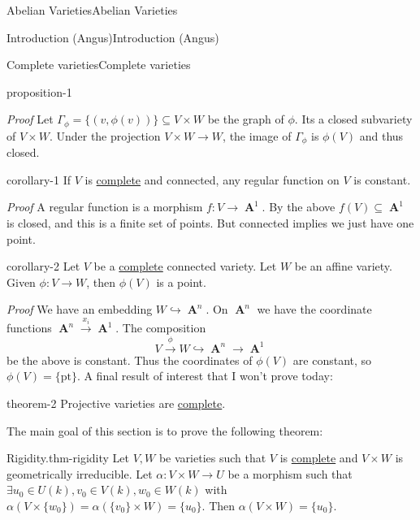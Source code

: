 \documentclass[10pt,]{book}
\makeatletter
\renewcommand*{\proofname}{Proof}
\renewenvironment{proof}[1][\proofname]{\par
  \pushQED{\qed}%
  \normalfont \topsep6\p@\@plus6\p@\relax
  \trivlist
  \item\relax
    {\itshape
    #1\@addpunct{.}}\hspace\labelsep\ignorespaces
}{%
  \popQED\endtrivlist\@endpefalse
}
\numberwithin{equation}{section}
\DeclareMathOperator{\aff}{\mathbf{A}}
\makeatother
\begin{document}
\begin{chapterptx}{Abelian Varieties}{}{Abelian Varieties}{}{}
\begin{sectionptx}{Introduction (Angus)}{}{Introduction (Angus)}{}{}
\begin{subsectionptx}{Complete varieties}{}{Complete varieties}{}{}
\begin{proposition}{}{}{proposition-1}
\end{proposition}
\begin{proof}\hypertarget{proof-2}{}
\hypertarget{p-22}{}%
Let \(\Gamma_\phi = \{(v, \phi(v))\} \subseteq V\times W\) be the graph of \(\phi\). Its a closed subvariety of \(V\times W\). Under the projection \(V\times W \to W\), the image of \(\Gamma_\phi\) is \(\phi(V)\) and thus closed.%
\end{proof}
\begin{corollary}{}{}{corollary-1}%
\hypertarget{p-23}{}%
If \(V\) is \hyperref[def-abelian-complete-var]{complete} and connected, any regular function on \(V\) is constant.%
\end{corollary}
\begin{proof}\hypertarget{proof-3}{}
\hypertarget{p-24}{}%
A regular function is a morphism \(f\colon V \to \aff^1\). By the above \(f(V) \subseteq \aff^1\) is closed, and this is a finite set of points. But connected implies we just have one point.%
\end{proof}
\begin{corollary}{}{}{corollary-2}%
\hypertarget{p-25}{}%
Let \(V \) be a \hyperref[def-abelian-complete-var]{complete} connected variety. Let \(W\) be an affine variety. Given \(\phi\colon V\to W\), then \(\phi (V)\) is a point.%
\end{corollary}
\begin{proof}\hypertarget{proof-4}{}
\hypertarget{p-26}{}%
We have an embedding \(W \hookrightarrow \aff^n\). On \(\aff^n\) we have the coordinate functions \(\aff^n \xrightarrow{x_i} \aff^1\). The composition%
\begin{equation*}
V \xrightarrow\phi W \hookrightarrow\aff^n \to \aff^1
\end{equation*}
be the above is constant. Thus the coordinates of \(\phi(V)\) are constant, so \(\phi(V) = \{\text{pt}\}\).%
\end{proof}
\hypertarget{p-27}{}%
A final result of interest that I won't prove today:%
\begin{theorem}{}{}{theorem-2}%
\hypertarget{p-28}{}%
Projective varieties are \hyperref[def-abelian-complete-var]{complete}.%
\end{theorem}
\hypertarget{p-29}{}%
The main goal of this section is to prove the following theorem:%
\begin{theorem}{Rigidity.}{}{thm-rigidity}%
\hypertarget{p-30}{}%
Let \(V,W\) be varieties such that \(V\) is \hyperref[def-abelian-complete-var]{complete} and  \(V\times W\) is geometrically irreducible. Let \(\alpha\colon V\times W \to U\) be a morphism such that \(\exists u_0\in U(k), v_0\in V(k), w_0\in W(k)\) with \(\alpha(V\times\{w_0\}) = \alpha (\{v_0\}\times W ) = \{u_0\}\). Then \(\alpha (V\times W) = \{u_0\}\).%

\end{theorem}
\end{subsectionptx}
\end{sectionptx}
\end{chapterptx}
\end{document}
